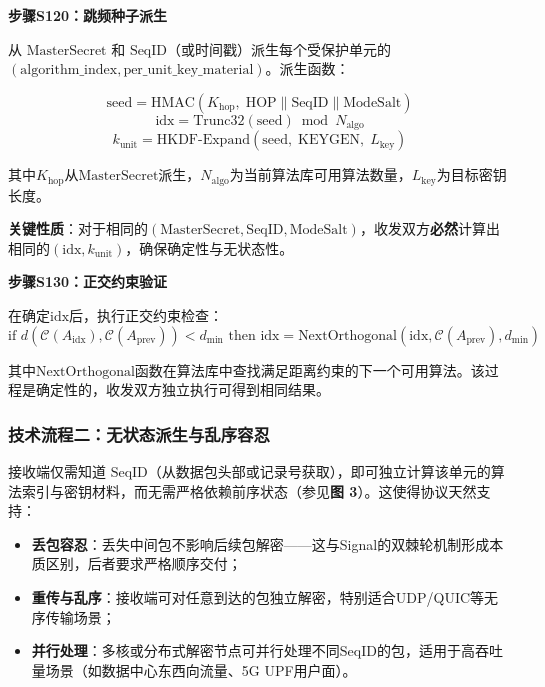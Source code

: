 ﻿\documentclass[12pt,a4paper]{article}
\begin{document}
\textbf{步骤S120：跳频种子派生}

从 $\text{MasterSecret}$ 和 $\text{SeqID}$（或时间戳）派生每个受保护单元的 $(\text{algorithm\_index}, \text{per\_unit\_key\_material})$。派生函数：

\begin{equation}\label{eq:derive}
    \text{seed} = \text{HMAC}(K_{\text{hop}}, \; \text{HOP} \| \text{SeqID} \| \text{ModeSalt})
\end{equation}
\begin{equation}\label{eq:idx}
    \text{idx} = \text{Trunc32}(\text{seed}) \bmod N_{\text{algo}}
\end{equation}
\begin{equation}\label{eq:key}
    k_{\text{unit}} = \text{HKDF-Expand}(\text{seed}, \; \text{KEYGEN}, \; L_{\text{key}})
\end{equation}

其中$K_{\text{hop}}$从$\text{MasterSecret}$派生，$N_{\text{algo}}$为当前算法库可用算法数量，$L_{\text{key}}$为目标密钥长度。

\textbf{关键性质}：对于相同的$(\text{MasterSecret}, \text{SeqID}, \text{ModeSalt})$，收发双方\textbf{必然}计算出相同的$(\text{idx}, k_{\text{unit}})$，确保确定性与无状态性。

\textbf{步骤S130：正交约束验证}

在确定$\text{idx}$后，执行正交约束检查：
\begin{equation}\label{eq:ortho}
    \text{if } d(\mathcal{C}(A_{\text{idx}}), \mathcal{C}(A_{\text{prev}})) < d_{\min} \text{ then idx} = \text{NextOrthogonal}(\text{idx}, \mathcal{C}(A_{\text{prev}}), d_{\min})
\end{equation}

其中$\text{NextOrthogonal}$函数在算法库中查找满足距离约束的下一个可用算法。该过程是确定性的，收发双方独立执行可得到相同结果。

\subsubsection{技术流程二：无状态派生与乱序容忍}

接收端仅需知道 $\text{SeqID}$（从数据包头部或记录号获取），即可独立计算该单元的算法索引与密钥材料，而无需严格依赖前序状态（参见\textbf{图 3}）。这使得协议天然支持：

\begin{itemize}
    \item \textbf{丢包容忍}：丢失中间包不影响后续包解密——这与Signal的双棘轮机制形成本质区别，后者要求严格顺序交付；
    \item \textbf{重传与乱序}：接收端可对任意到达的包独立解密，特别适合UDP/QUIC等无序传输场景；
    \item \textbf{并行处理}：多核或分布式解密节点可并行处理不同$\text{SeqID}$的包，适用于高吞吐量场景（如数据中心东西向流量、5G UPF用户面）。
\end{itemize}
\end{document}

